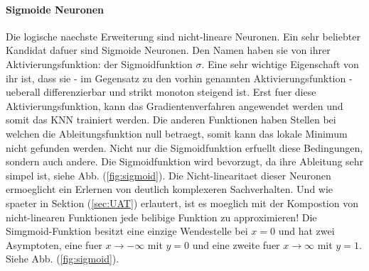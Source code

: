 \documentclass[../main]{subfiles}
\begin{document}
\paragraph{Sigmoide Neuronen}
Die logische naechste Erweiterung sind nicht-lineare Neuronen.
Ein sehr beliebter Kandidat dafuer sind Sigmoide Neuronen.
Den Namen haben sie von ihrer Aktivierungsfunktion: der Sigmoidfunktion $\sigma$.
Eine sehr wichtige Eigenschaft von ihr ist, dass sie - im Gegensatz zu den vorhin
genannten Aktivierungsfunktion - ueberall differenzierbar und strikt monoton
steigend ist. Erst fuer diese Aktivierungsfunktion, kann das Gradientenverfahren
angewendet werden und somit das KNN trainiert werden. Die anderen
Funktionen haben Stellen bei welchen die Ableitungsfunktion null
betraegt, somit kann das lokale Minimum nicht gefunden werden.
Nicht nur die Sigmoidfunktion erfuellt diese Bedingungen, sondern auch andere. Die Sigmoidfunktion wird
bevorzugt, da ihre Ableitung sehr simpel ist, siehe Abb. (\ref{fig:sigmoid}).
Die Nicht-linearitaet dieser Neuronen ermoeglicht ein Erlernen von deutlich komplexeren Sachverhalten.
Und wie spaeter in Sektion (\ref{sec:UAT}) erlautert, ist es moeglich mit der Kompostion von nicht-linearen
Funktionen jede belibige Funktion zu approximieren!
\para{}
Die Simgmoid-Funktion besitzt eine einzige Wendestelle bei $x=0$ und hat zwei Asymptoten, eine fuer $x \to -\infty$ mit $y=0$
und eine zweite fuer $x \to\infty$ mit $y=1$. Siehe Abb. (\ref{fig:sigmoid}).
\end{document}
